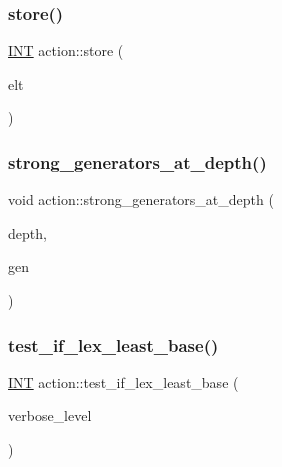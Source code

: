 \mbox{\label{classaction_aba6da359dbae5200ee0b9b44bbc9bf89}} 
\subsubsection{\texorpdfstring{store()}{store()}}
{\footnotesize\ttfamily \mbox{\hyperlink{galois_8h_a09fddde158a3a20bd2dcadb609de11dc}{I\+NT}} action\+::store (\begin{DoxyParamCaption}\item[{void $\ast$}]{elt }\end{DoxyParamCaption})}

\mbox{\label{classaction_a669cd686b88190d7ea71846466606a60}} 
\subsubsection{\texorpdfstring{strong\+\_\+generators\+\_\+at\+\_\+depth()}{strong\_generators\_at\_depth()}}
{\footnotesize\ttfamily void action\+::strong\+\_\+generators\+\_\+at\+\_\+depth (\begin{DoxyParamCaption}\item[{\mbox{\hyperlink{galois_8h_a09fddde158a3a20bd2dcadb609de11dc}{I\+NT}}}]{depth,  }\item[{\mbox{\hyperlink{classvector__ge}{vector\+\_\+ge}} \&}]{gen }\end{DoxyParamCaption})}

\mbox{\label{classaction_afb63a2be19013fcf35337553d7c08eda}} 
\subsubsection{\texorpdfstring{test\+\_\+if\+\_\+lex\+\_\+least\+\_\+base()}{test\_if\_lex\_least\_base()}}
{\footnotesize\ttfamily \mbox{\hyperlink{galois_8h_a09fddde158a3a20bd2dcadb609de11dc}{I\+NT}} action\+::test\+\_\+if\+\_\+lex\+\_\+least\+\_\+base (\begin{DoxyParamCaption}\item[{\mbox{\hyperlink{galois_8h_a09fddde158a3a20bd2dcadb609de11dc}{I\+NT}}}]{verbose\+\_\+level }\end{DoxyParamCaption})}

